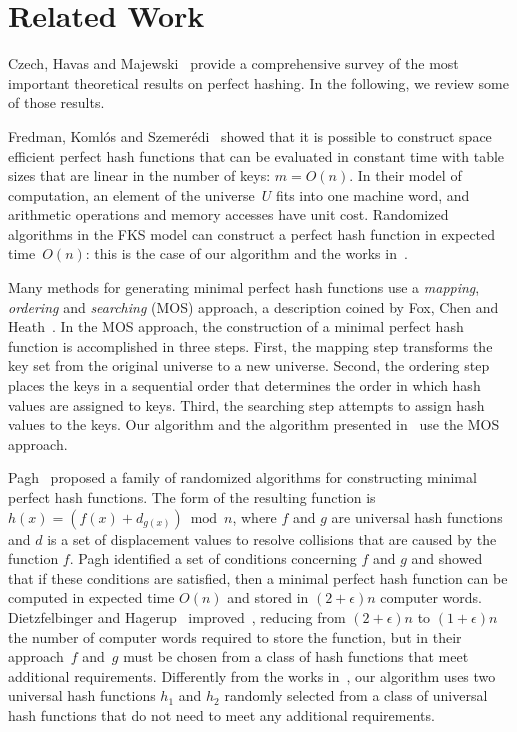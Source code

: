 \section{Related Work}
Czech, Havas and Majewski~\cite{chm97} provide a
comprehensive survey of the most important theoretical results
on perfect hashing.
In the following, we review some of those results.

Fredman, Koml\'os and Szemer\'edi~\cite{FKS84} showed that it is possible to
construct space efficient perfect hash functions that can be evaluated in
constant time with table sizes that are linear in the number of keys:
$m=O(n)$.  In their model of computation, an element of the universe~$U$ fits
into one machine word, and arithmetic operations and memory accesses have unit
cost.  Randomized algorithms in the FKS model can construct a perfect hash
function in expected time~$O(n)$:
this is the case of our algorithm and the works in~\cite{chm92,p99}.

Many methods for generating minimal perfect hash functions use a
{\em mapping}, {\em ordering} and {\em searching}
(MOS) approach,
a description coined by Fox, Chen and Heath~\cite{fch92}.
In the MOS approach, the construction of a minimal perfect hash function
is accomplished in three steps.
First, the mapping step transforms the key set from the original universe
to a new universe.
Second, the ordering step places the keys in a sequential order that
determines the order in which hash values are assigned to keys.
Third, the searching step attempts to assign hash values to the keys.
Our algorithm and the algorithm presented in~\cite{chm92} use the
MOS approach.

Pagh~\cite{p99} proposed a family of randomized algorithms for
constructing minimal perfect hash functions.
The form of the resulting function is $h(x) = (f(x) + d_{g(x)}) \bmod n$,
where $f$ and $g$ are universal hash functions and $d$ is a set of
displacement values to resolve collisions that are caused by the function $f$.
Pagh identified a set of conditions concerning $f$ and $g$ and showed
that if these conditions are satisfied, then a minimal perfect hash
function can be computed in expected time $O(n)$ and stored in
$(2+\epsilon)n$ computer words.
Dietzfelbinger and Hagerup~\cite{dh01} improved~\cite{p99},
reducing from $(2+\epsilon)n$ to $(1+\epsilon)n$ the number of computer
words required to store the function, but in their approach~$f$ and~$g$ must
be chosen from a class
of hash functions that meet additional requirements.
Differently from the works in~\cite{p99,dh01}, our algorithm uses two
universal hash functions $h_1$ and $h_2$ randomly selected from a class
of universal hash functions that do not need to meet any additional
requirements.

